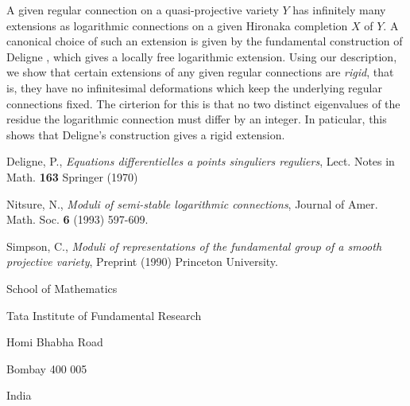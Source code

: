 A given regular connection on a quasi-projective variety $Y$ has infinitely many extensions as logarithmic connections on a given Hironaka completion $X$ of $Y$. A canonical choice of such an extension is given by the fundamental construction of Deligne \cite{art14-keyD}, which gives a locally free logarithmic extension. Using our description, we show that certain extensions of any given regular connections are \textit{rigid}, that is, they have no infinitesimal deformations which keep the underlying regular connections fixed. The cirterion for this is that no two distinct eigenvalues of the residue the logarithmic connection must differ by an integer. In paticular, this shows that Deligne's construction gives a rigid extension.

\begin{thebibliography}{99}
 Deligne, P., \textit{Equations differentielles a points singuliers reguliers}, Lect. Notes in Math. {\bf 163} Springer (1970)

 Nitsure, N., \textit{Moduli of semi-stable logarithmic connections}, Journal of Amer. Math. Soc.
 {\bf 6} (1993) 597-609.

 Simpson, C., \textit{Moduli of representations of the fundamental group of a smooth projective variety}, Preprint (1990) Princeton University.
\end{thebibliography}

\begin{flushleft}
School of Mathematics

Tata Institute of Fundamental Research

Homi Bhabha Road

Bombay 400 005

India
\end{flushleft}
